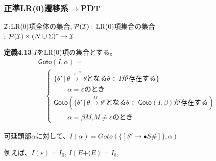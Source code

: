 \documentclass[dvipdfmx]{beamer}
\begin{document}
\begin{frame}
  \frametitle{正準LR(0)遷移系$\rightarrow$PDT}
  ${\cal I}$:LR(0)項全体の集合, ${\cal P}({\cal I}):$ LR(0)項集合の集合\\
   : ${\cal P}({\cal I})\times(N\cup\Sigma)^\ast\rightarrow \mathcal{I}$\\

  \begin{itembox}[l]{\bf 定義4.13}
    {\small $I$をLR(0)項の集合とする。
      \[\begin{array}{l}
          \mathsf{Goto}(I,\alpha)= \\
          \quad\left\{\begin{array}{l}
                        \{\theta'\,|\,\theta\xrightarrow{\varepsilon}^\ast\theta\mbox{となる$\theta\in I$が存在する}\} \\
                        \qquad\mbox{$\alpha=\varepsilon$のとき}                                                   \\
                        \mathsf{Goto}(\{\theta'\,|\,\theta\xrightarrow{M}\theta'\mbox{となる$\theta\in
                        \mathsf{Goto}(I,\beta)$が存在する})                                                         \\
                        \qquad\mbox{$\alpha=\beta M$,$M\not=\varepsilon$のとき}
                      \end{array}\right .
        \end{array}\]
    }
  \end{itembox}

  \vspace*{5pt}

  {\small

    可延頭部$\alpha$に対して、$I(\alpha)=Goto(\{[S'\rightarrow\bullet
          S\#]\},\alpha)$

    例えば、$I(\varepsilon)=I_0$, $I(E\mathtt{+(}E)=I_8$,%
  }
\end{frame}
\end{document}
